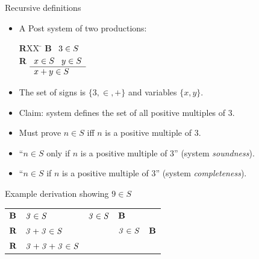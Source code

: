 \documentclass[style=sailor,size=12pt]{powerdot}
\newcommand{\id}[1]{\mbox{\it #1\/}}
\newcommand{\bid}[1]{\mbox{\bf #1}}
\begin{document}
\begin{wideslide}[bm=,toc=]{Recursive definitions}
\begin{itemize}
\item A Post system of two productions:
\vspace{-1em}
\begin{tabbing}
{\bf R}XX \=  \kill
{\bf B} \>
        \(\begin{array}[t]{l}
        3\in S
        \end{array}\) \\[2ex]
{\bf R} \>
        \(\begin{array}[t]{l}
        x \in S \;\;\;y \in S \\
        \hline
        x + y \in S
        \end{array}\)
\end{tabbing}
\item The set of signs is $\{3,\in,+\}$ and variables $\{x,y\}$.
\item Claim: system defines the set of all positive multiples of 3.
\item Must prove $n\in S$ iff $n$ is a positive multiple of 3.
\item ``$n\in S$ only if $n$ is a positive multiple of 3'' (system {\em soundness\/}).
\item ``$n\in S$ if $n$ is a positive multiple of 3'' (system {\em completeness\/}).
\end{itemize}
\end{wideslide}
\begin{wideslide}[bm=,toc=]{Example derivation showing $9 \in S$}
\begin{center}
\begin{tabular}{lllll}
  $\bid{B}$  & $\id{3}\in \id{S}$           & $\id{3}\in \id{S}$ & $\bid{B}$
  \\ \cline{2-3}
  $\bid{R}$  & $\id{3} + \id{3} \in \id{S}$ &                    & $\id{3}\in \id{S}$ & $\bid{B}$ 
  \\ \cline{2-4} 
  $\bid{R}$  & $\id{3} + \id{3} + \id{3} \in \id{S}$ &           &                    &  \\ 
\end{tabular}
\end{center}

\end{wideslide}
\end{document}
